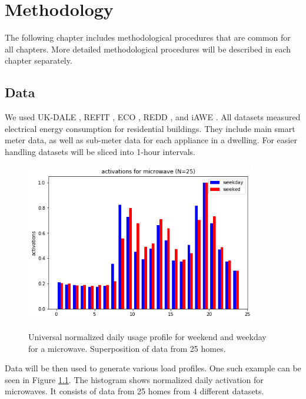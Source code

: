 
\chapter{Methodology} %
\label{chapter3} 

The following chapter includes methodological procedures that are common for all chapters.
More detailed methodological procedures will be described in each chapter separately. 

\section{Data}

We used UK-DALE \cite{UKDALE}, REFIT \cite{REFIT}, ECO \cite{ECO}, REDD \cite{REDD}, and iAWE \cite{iAWE}.
All datasets measured electrical energy consumption for residential buildings. 
They include main smart meter data, as well as sub-meter data for each appliance in a dwelling. 
For easier handling datasets will be sliced into 1-hour intervals. 

\begin{figure}[H]
	\centering
	\caption{Universal normalized daily usage profile for weekend and weekday for a microwave. Superposition of data from 25 homes.}
	\includegraphics[width=0.9\textwidth]{../Figures/microwave_norm_n25.png}
	\label{fig:UniNormMicrowave}
\end{figure}

Data will be then used to generate various load profiles. 
One such example can be seen in Figure \ref{fig:UniNormMicrowave}. The histogram shows normalized daily 
activation for microwaves. It consists of data from 25 homes from 4 different
datasets. 

